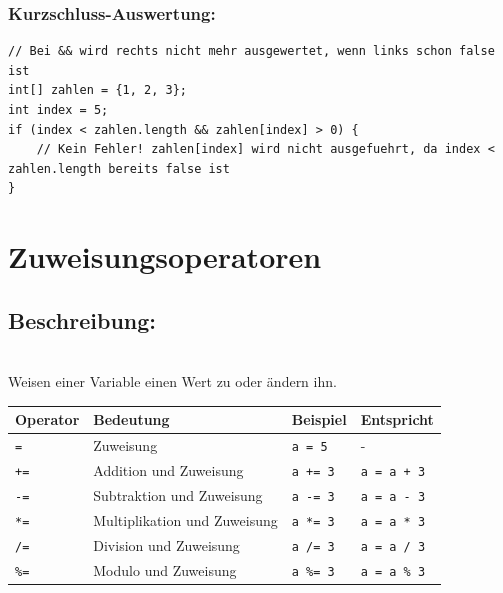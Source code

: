 \subsubsection*{Kurzschluss-Auswertung:}
\begin{lstlisting}
// Bei && wird rechts nicht mehr ausgewertet, wenn links schon false ist
int[] zahlen = {1, 2, 3};
int index = 5;
if (index < zahlen.length && zahlen[index] > 0) {
    // Kein Fehler! zahlen[index] wird nicht ausgefuehrt, da index < zahlen.length bereits false ist
}
\end{lstlisting}

\newpage


\section*{Zuweisungsoperatoren}

\subsection*{Beschreibung:}\\
Weisen einer Variable einen Wert zu oder ändern ihn.

\begin{center}
	\begin{tabular}{|l|l|l|l|}
		\hline
		\textbf{Operator} & \textbf{Bedeutung} & \textbf{Beispiel} & \textbf{Entspricht} \\
		\hline
		\texttt{=} & Zuweisung & \texttt{a = 5} & - \\
		\hline
		\texttt{+=} & Addition und Zuweisung & \texttt{a += 3} & \texttt{a = a + 3} \\
		\hline
		\texttt{-=} & Subtraktion und Zuweisung & \texttt{a -= 3} & \texttt{a = a - 3} \\
		\hline
		\texttt{*=} & Multiplikation und Zuweisung & \texttt{a *= 3} & \texttt{a = a * 3} \\
		\hline
		\texttt{/=} & Division und Zuweisung & \texttt{a /= 3} & \texttt{a = a / 3} \\
		\hline
		\texttt{\%=} & Modulo und Zuweisung & \texttt{a \%= 3} & \texttt{a = a \% 3} \\
		\hline
	\end{tabular}
\end{center}

